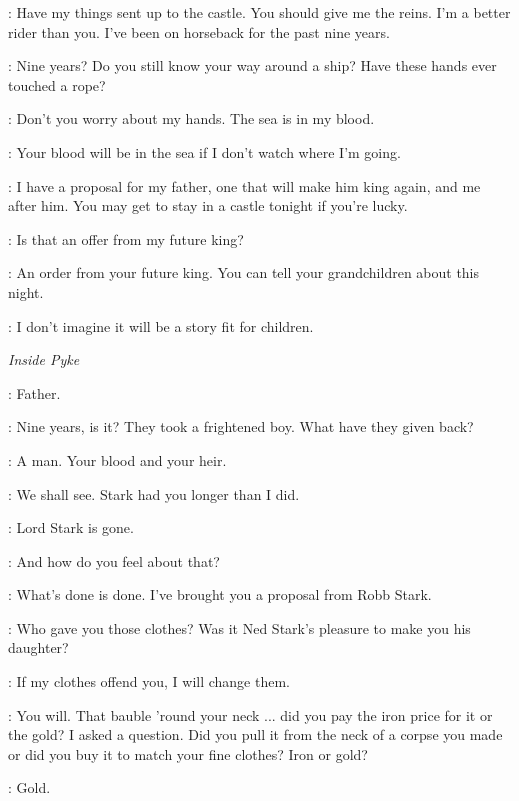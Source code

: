 \THEON: Have my things sent up to the castle.  You should give me the reins. I'm a better rider than you. I've been on horseback for the past nine years.

\YARA: Nine years? Do you still know your way around a ship? Have these hands ever touched a rope?

\THEON: Don't you worry about my hands. The sea is in my blood.


\YARA: Your blood will be in the sea if I don't watch where I'm going.

\THEON: I have a proposal for my father, one that will make him king again, and me after him. You may get to stay in a castle tonight if you're lucky.

\YARA: Is that an offer from my future king?

\THEON: An order from your future king. You can tell your grandchildren about this night.

\YARA: I don't imagine it will be a story fit for children.


\scene

\textit{Inside Pyke}


\THEON: Father.

\BALON: Nine years, is it? They took a frightened boy. What have they given back?

\THEON: A man. Your blood and your heir.

\BALON: We shall see. Stark had you longer than I did.

\THEON: Lord Stark is gone.

\BALON: And how do you feel about that?

\THEON: What's done is done. I've brought you a proposal from Robb Stark.

\BALON: Who gave you those clothes? Was it Ned Stark's pleasure to make you his daughter?

\THEON: If my clothes offend you, I will change them.

\BALON: You will. That bauble 'round your neck ... did you pay the iron price for it or the gold?  I asked a question. Did you pull it from the neck of a corpse you made or did you buy it to match your fine clothes? Iron or gold?

\THEON: Gold.

